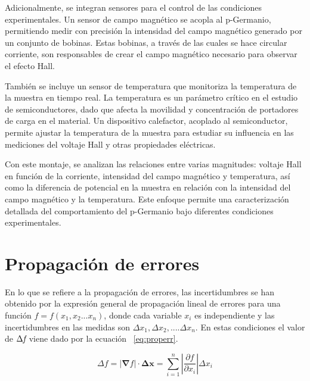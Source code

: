 	\vspace{\baselineskip}
	
	Adicionalmente, se integran sensores para el control de las condiciones experimentales. Un sensor de campo magnético se acopla al p-Germanio, permitiendo medir con precisión la intensidad del campo magnético generado por un conjunto de bobinas. Estas bobinas, a través de las cuales se hace circular corriente, son responsables de crear el campo magnético necesario para observar el efecto Hall.
	
	\vspace{\baselineskip}
	
	También se incluye un sensor de temperatura que monitoriza la temperatura de la muestra en tiempo real. La temperatura es un parámetro crítico en el estudio de semiconductores, dado que afecta la movilidad y concentración de portadores de carga en el material. Un dispositivo calefactor, acoplado al semiconductor, permite ajustar la temperatura de la muestra para estudiar su influencia en las mediciones del voltaje Hall y otras propiedades eléctricas.
	
	\vspace{\baselineskip}
	
	Con este montaje, se analizan las relaciones entre varias magnitudes: voltaje Hall en función de la corriente, intensidad del campo magnético y temperatura, así como la diferencia de potencial en la muestra en relación con la intensidad del campo magnético y la temperatura. Este enfoque permite una caracterización detallada del comportamiento del p-Germanio bajo diferentes condiciones experimentales.


	\section{Propagación de errores}
	
	En lo que se refiere a la propagación de errores, las incertidumbres se han obtenido por la expresión general de propagación lineal de errores para una función $f=f(x_1,x_2...x_n)$, donde cada variable $x_i$  es independiente y las incertidumbres en las medidas son $\Delta x_1, \Delta x_2,....\Delta x_n$. En estas condiciones el valor de $\Delta \emph{f}$ viene dado por la ecuación ~\ref{eq:properr}. 
	
	\begin{equation}\label{eq:properr}
		{\Delta f} = \left|\mathbf{\nabla}f\right|\cdot\mathbf{\Delta x} =  \sum_{i=1}^{n}\left|\frac{\partial f}{\partial x_i}\right|\Delta x_i
	\end{equation}
	
